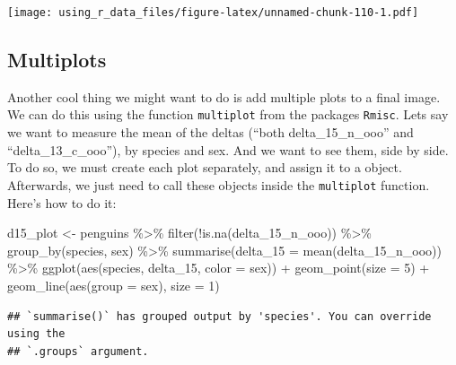 \documentclass[
]{book}
\newenvironment{Shaded}{\begin{snugshade}}{\end{snugshade}}
\newcommand{\AttributeTok}[1]{\textcolor[rgb]{0.77,0.63,0.00}{#1}}
\newcommand{\DecValTok}[1]{\textcolor[rgb]{0.00,0.00,0.81}{#1}}
\newcommand{\FunctionTok}[1]{\textcolor[rgb]{0.00,0.00,0.00}{#1}}
\newcommand{\NormalTok}[1]{#1}
\newcommand{\OtherTok}[1]{\textcolor[rgb]{0.56,0.35,0.01}{#1}}
\newcommand{\SpecialCharTok}[1]{\textcolor[rgb]{0.00,0.00,0.00}{#1}}
\begin{document}
\texttt{[image: using\_r\_data\_files/figure-latex/unnamed-chunk-110-1.pdf]}

\hypertarget{multiplots}{%
\subsection{Multiplots}\label{multiplots}}

Another cool thing we might want to do is add multiple plots to a final image.
We can do this using the function \texttt{multiplot} from the packages \texttt{Rmisc}.
Lets say we want to measure the mean of the deltas (``both delta\_15\_n\_ooo'' and ``delta\_13\_c\_ooo''), by species and sex.
And we want to see them, side by side.
To do so, we must create each plot separately, and assign it to a object.
Afterwards, we just need to call these objects inside the \texttt{multiplot} function.
Here's how to do it:

\begin{Shaded}
\begin{Highlighting}[]
\NormalTok{d15\_plot }\OtherTok{\textless{}{-}}\NormalTok{ penguins }\SpecialCharTok{\%\textgreater{}\%} 
  \FunctionTok{filter}\NormalTok{(}\SpecialCharTok{!}\FunctionTok{is.na}\NormalTok{(delta\_15\_n\_ooo)) }\SpecialCharTok{\%\textgreater{}\%} 
  \FunctionTok{group\_by}\NormalTok{(species, sex) }\SpecialCharTok{\%\textgreater{}\%} 
  \FunctionTok{summarise}\NormalTok{(}\AttributeTok{delta\_15 =} \FunctionTok{mean}\NormalTok{(delta\_15\_n\_ooo)) }\SpecialCharTok{\%\textgreater{}\%} 
  \FunctionTok{ggplot}\NormalTok{(}\FunctionTok{aes}\NormalTok{(species, delta\_15, }\AttributeTok{color =}\NormalTok{ sex)) }\SpecialCharTok{+}
  \FunctionTok{geom\_point}\NormalTok{(}\AttributeTok{size =} \DecValTok{5}\NormalTok{) }\SpecialCharTok{+}
  \FunctionTok{geom\_line}\NormalTok{(}\FunctionTok{aes}\NormalTok{(}\AttributeTok{group =}\NormalTok{ sex), }\AttributeTok{size =} \DecValTok{1}\NormalTok{)}
\end{Highlighting}
\end{Shaded}

\begin{verbatim}
## `summarise()` has grouped output by 'species'. You can override using the
## `.groups` argument.
\end{verbatim}
\end{document}
